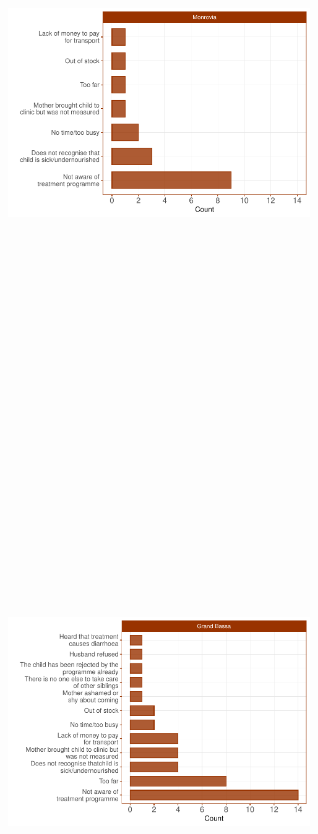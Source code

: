 \documentclass[12pt,a4paper]{article}
\begin{document}
\begin{figure}[H]

{\centering \includegraphics[width=8cm,height=16cm]{liberiaCoverageReport_files/figure-latex/cmam3-1} \includegraphics[width=8cm,height=16cm]{liberiaCoverageReport_files/figure-latex/cmam3-2} 

}
\end{figure}
\end{document}
